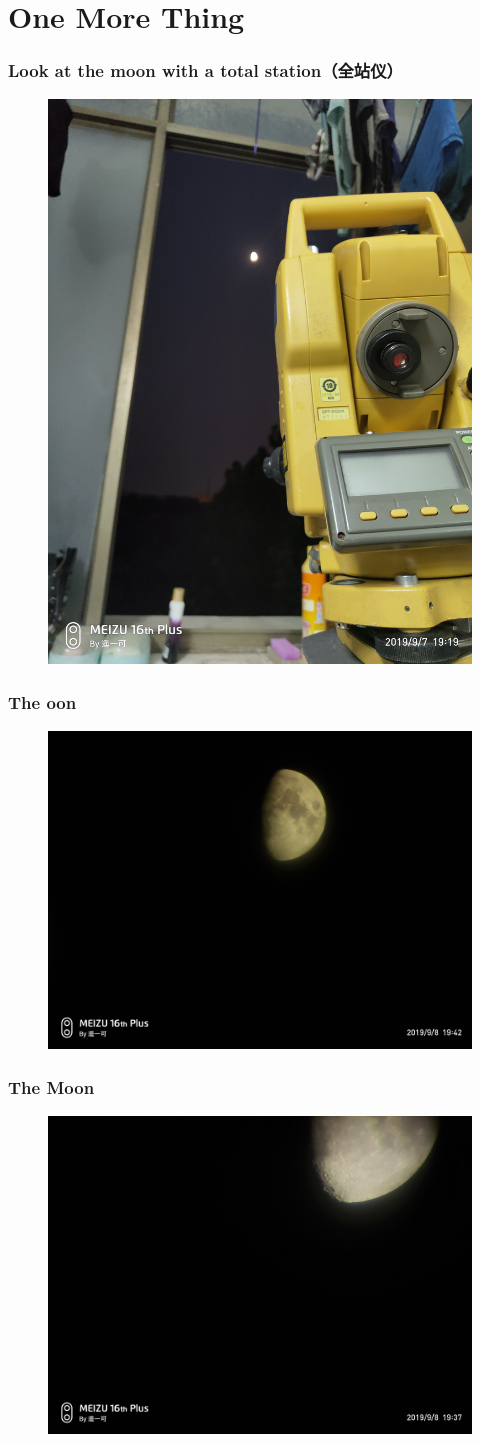 \section{One More Thing}
\begin{frame}
    \frametitle{Look at the moon with a total station（全站仪）}
    \begin{figure}
        \includegraphics[width=0.5\linewidth]{Assets/total-station.jpg}
    \end{figure}
\end{frame}
\begin{frame}
    \frametitle{The oon}
    \begin{figure}
        \includegraphics[width=0.85\linewidth]{Assets/Moon1.jpg}
    \end{figure}
\end{frame}
\begin{frame}
    \frametitle{The Moon}
    \begin{figure}
        \includegraphics[width=0.85\linewidth]{Assets/Moon2.jpg}
    \end{figure}


\end{frame}
